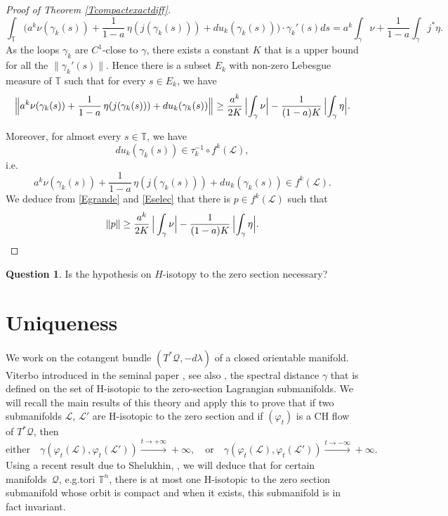 \documentclass[10pt]{amsart}
\theoremstyle{definition}
\newtheorem*{question*}{Question}
\def\T{\mathbb{T}}
\def\cL{{\mathcal L}}
\def\cQ{{\mathcal Q}}
\providecommand{\eg}{e.g.}\providecommand{\ie}{i.e.}\providecommand{\etc}{etc.}\providecommand{\resp}{resp.}\providecommand{\cf}{cf.}
\begin{document}
\begin{proof}[Proof of Theorem \ref{Tcompactexactdiff}]
\[
\int_\T \Big( a^k\nu(\gamma_k(s))+\frac{1}{1-a}\,\eta(j(\gamma_k(s)))+du_k(\gamma_k(s))\Big)\cdot \gamma_k'(s)ds=a^k\int_\gamma\nu+\frac{1}{1-a}\int_\gamma j^*\eta.
\]
As the loops $\gamma_k$ are $C^1$-close to $\gamma$, there exists a constant $K$ that is a upper bound for all the $\| \gamma_k'(s)\|$. Hence there is a subset $E_k$ with non-zero Lebesgue measure of $\T$ such that for every $s\in E_k$, we have
\begin{equation}\label{Egrande}
\Bigl\|a^k\nu(\gamma_k(s))+\frac{1}{1-a}\,\eta(j(\gamma_k(s)))+du_k(\gamma_k(s))\Bigr\|\geq \frac{a^k}{2K}\,\Bigl\vert\int_\gamma\nu\Bigr\vert-\frac{1}{(1-a)K}\,\Bigl\vert\int_\gamma\eta\Bigr\vert.\end{equation}

Moreover, for almost every $s\in\T$, we have
\[
du_k(\gamma_k(s))\in \tau_{k}^{-1}\circ f^k(\cL),
\]
\ie
\begin{equation}\label{Eselec}
a^k\nu(\gamma_k(s))+\frac{1}{1-a}\,\eta(j(\gamma_k(s)))+du_k(\gamma_k(s))\in f^k(\cL).
\end{equation}
We deduce from \eqref{Egrande} and \eqref{Eselec} that there is $p\in f^k(\cL)$ such that
\[
\| p\|\geq \frac{a^k}{2K}\,\Big\vert\int_\gamma\nu\Big\vert-\frac{1}{(1-a)K}\,\Bigl\vert\int_\gamma\eta\Bigr\vert.\qedhere
\]
\end{proof}

\begin{question*}
Is the hypothesis on $H$-isotopy to the zero section necessary?
\end{question*}

\section{Uniqueness}\label{Suniqueness}

We work on the cotangent bundle $(T^*\cQ, -d\lambda)$ of a closed orientable manifold.
Viterbo introduced in the seminal paper \cite{Vit1992}, see also \cite{Vit2008}, the spectral distance $\gamma$ that is defined on the set of H-isotopic to the zero-section Lagrangian submanifolds.
We will recall the main results of this theory and apply this to prove that if two submanifolds $\cL$, $\cL'$ are H-isotopic to the zero section and if $(\varphi_t)$ is a CH flow of $T^*\cQ$, then
\[
\text{either}\quad\gamma (\varphi_t(\cL), \varphi_t(\cL'))\xrightarrow[]{t\to +\infty}+\infty,\quad\text{or}\quad\gamma (\varphi_t(\cL), \varphi_t(\cL'))\xrightarrow[]{t\to -\infty}+\infty.
\]
Using a recent result due to Shelukhin, \cite{Shel2020}, we will deduce that for certain manifolds~$\cQ$, \eg tori $\T^n$, there is at most one H-isotopic to the zero section submanifold whose orbit is compact and when it exists, this submanifold is in fact invariant.
\end{document}
